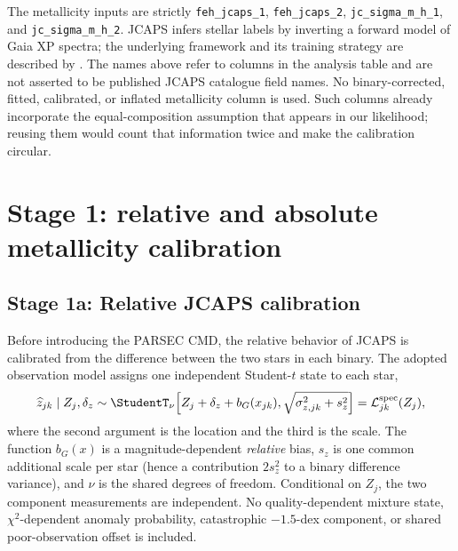 The metallicity inputs are strictly
\nolinkurl{feh_jcaps_1}, \nolinkurl{feh_jcaps_2},
\nolinkurl{jc_sigma_m_h_1}, and \nolinkurl{jc_sigma_m_h_2}.
JCAPS infers stellar labels by inverting a forward model of Gaia XP spectra;
the underlying framework and its training strategy are described by
\citet{Li2026JCaPS}.  The names above refer to columns in the analysis table and
are not asserted to be published JCAPS catalogue field names.
No binary-corrected, fitted, calibrated, or inflated metallicity column is used.
Such columns already incorporate the equal-composition assumption that appears
in our likelihood; reusing them would count that information twice and make the
calibration circular.

\section{Stage 1: relative and absolute metallicity calibration}
\label{sec:stage1}

\subsection{Stage 1a: Relative JCAPS calibration}

Before introducing the PARSEC CMD, the relative behavior of JCAPS is calibrated
from the difference between the two stars in each binary.  The adopted
observation model assigns one independent Student-$t$ state to each star,
\begin{equation}
 \widehat z_{jk}\mid Z_j,\delta_z
 \sim \StudentT_{\nu}\!\left[
 Z_j+\delta_z+b_G(x_{jk}),
 \sqrt{\sigma_{z,jk}^2+s_z^2}\right] = \mathcal{L}^{\mathrm{spec}}_{jk}(Z_j),
 \label{eq:spec-model}
\end{equation}
where the second argument is the location and the third is the scale.  The
function $b_G(x)$ is a magnitude-dependent \emph{relative} bias, $s_z$ is one
common additional scale per star (hence a contribution $2s_z^2$ to a binary
difference variance), and $\nu$ is the shared degrees of freedom.  Conditional
on $Z_j$, the two component measurements are independent.  No quality-dependent
mixture state, $\chi^2$-dependent anomaly probability, catastrophic
$-1.5$-dex component, or shared poor-observation offset is included.

